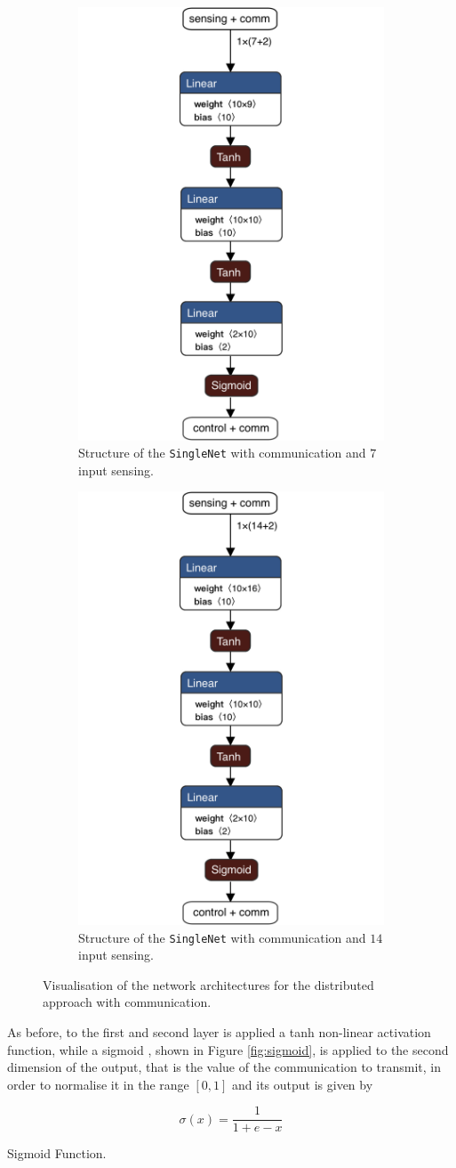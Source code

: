 \begin{figure}[H]
	\centering
	\begin{subfigure}[h]{0.495\textwidth}
		\centering
		\includegraphics[width=.3\textwidth]{contents/images/task1distributedcomm@4x}%
		\caption{Structure of the \texttt{SingleNet} with communication and $7$ 
		input sensing.}
	\end{subfigure}
	\hfill
	\begin{subfigure}[h]{0.495\textwidth}
		\centering
		\includegraphics[width=.3\textwidth]{contents/images/task1distributed_allcomm@4x}
		\caption{Structure of the \texttt{SingleNet} with communication and $14$ 
		input sensing.}
	\end{subfigure}
	\caption[Network architectures for the distributed approach with 
	communication.]{Visualisation of the network architectures for the distributed 
	approach with communication.}
	\label{fig:singlenetcomm1}
\end{figure}

As before, to the first and second layer is applied a tanh non-linear activation 
function, while a sigmoid \cite[see][]{han1995influence}, shown in Figure 
\ref{fig:sigmoid}, is applied to the second dimension of the output, that is the 
value of the communication to transmit, in order to normalise it in the range $[0, 
1]$ and its output is given by
\begin{Equation}[htb]
	\centering
	\begin{equation}
	\sigma(x)= \frac{1}{1 + e - x}
	\end{equation}
	\caption{Sigmoid Function.}
	\label{eq:sigmoid}
\end{Equation}

